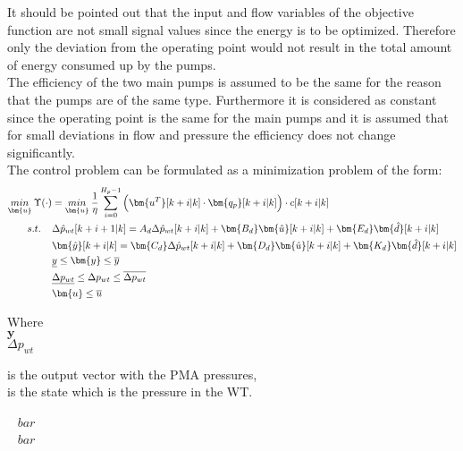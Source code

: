 It should be pointed out that the input and flow variables of the objective function are not small signal values since the energy is to be optimized. Therefore only the deviation from the operating point would not result in the total amount of energy consumed up by the pumps. 
\\
The efficiency of the two main pumps is assumed to be the same for the reason that the pumps are of the same type. Furthermore it is considered as constant since the operating point is the same for the main pumps and it is assumed that for small deviations in flow and pressure the efficiency does not change significantly. 
\\
The control problem can be formulated as a minimization problem of the form:
\begin{align}
\underset{\bm{u}}{min} \:  \Upsilon(\cdot) &= \underset{\bm{u}}{min} \: \frac{1}{\eta} \sum_{i=0}^{H_p-1} \Big( \bm{u^T}[k+i|k] \cdot \bm{q_{p}}[k+i|k]\Big)\cdot c[k+i|k] \label{eqcost1} \\
%
\newline
s.t. \:\:\:\:\: & \Delta \hat{p}_{wt} [k+i+1|k] = A_d \Delta \hat{p}_{wt}[k+i|k]  + \bm{B_d} \bm{\hat{u}}[k+i|k] + \bm{E_d} \bm{\hat{d}}[k+i|k] \label{dyn}  \\ 
%
&\bm{\hat{y}}[k+i|k] = \bm{C_d} \Delta \hat{p}_{wt}[k+i|k] + \bm{D_d} \bm{\hat{u}}[k+i|k] + \bm{K_d} \bm{\hat{d}}[k+i|k] \\
%
& \underline{y} \leq \bm{y} \leq \overline{y} \\
%
& \underline{\Delta p_{wt}} \leq \Delta p_{wt} \leq \overline{\Delta p_{wt}} \\
%
& \bm{u} \leq \overline{u} \label{eqconst2} 
\end{align}

 \begin{minipage}[t]{0.24\textwidth}
 Where\\
 \hspace*{8mm} $\bm{y}$ \\
 \hspace*{8mm} $\Delta p_{wt}$ 
 \end{minipage}
 \begin{minipage}[t]{0.63\textwidth}
 \vspace*{2mm}
 is the output vector with the PMA pressures,\\
 is the state which is the pressure in the WT.
 \end{minipage}
 \begin{minipage}[t]{0.10\textwidth}
 \vspace*{2mm}
 \textcolor{White}{te}$\unit{bar}$\\
 \textcolor{White}{te}$\unit{bar}$
 \end{minipage}

